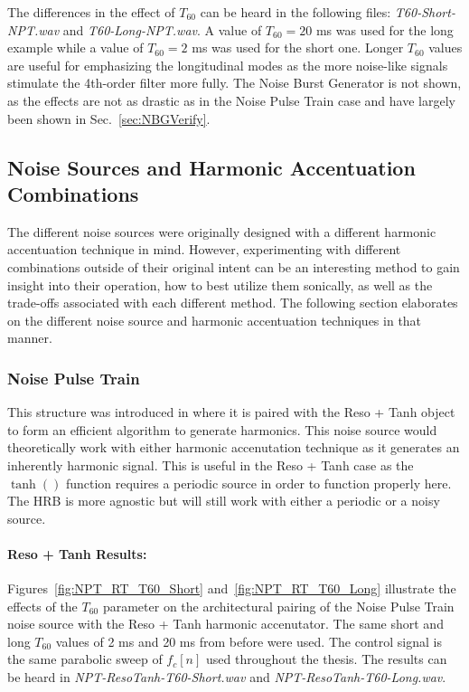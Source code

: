 \documentclass[../main.tex]{subfiles}
\begin{document}
The differences in the effect of $T_{60}$ can be heard in the following files: \emph{T60-Short-NPT.wav} and \emph{T60-Long-NPT.wav}. A value of $T_{60} = 20$ ms was used for the long example while a value of $T_{60} = 2$ ms was used for the short one. Longer $T_{60}$ values are useful for emphasizing the longitudinal modes as the more noise-like signals stimulate the 4th-order filter more fully. The Noise Burst Generator is not shown, as the effects are not as drastic as in the Noise Pulse Train case and have largely been shown in Sec.~\ref{sec:NBGVerify}.

\subsection{Noise Sources and Harmonic Accentuation Combinations}
The different noise sources were originally designed with a different harmonic accentuation technique in mind. However, experimenting with different combinations outside of their original intent can be an interesting method to gain insight into their operation, how to best utilize them sonically, as well as the trade-offs associated with each different method. The following section elaborates on the different noise source and harmonic accentuation techniques in that manner.

\subsubsection{Noise Pulse Train}
This structure was introduced in  where it is paired with the Reso + Tanh object to form an efficient algorithm to generate harmonics. This noise source would theoretically work with either harmonic accenutation technique as it generates an inherently harmonic signal. This is useful in the Reso + Tanh case as the $\tanh()$ function requires a periodic source in order to function properly here. The HRB is more agnostic but will still work with either a periodic or a noisy source.

\paragraph{Reso + Tanh Results:}
Figures~\ref{fig:NPT_RT_T60_Short} and~\ref{fig:NPT_RT_T60_Long} illustrate the effects of the $T_{60}$ parameter on the architectural pairing of the Noise Pulse Train noise source with the Reso + Tanh harmonic accenutator. The same short and long $T_{60}$ values of 2 ms and 20 ms from before were used. The control signal is the same parabolic sweep of $f_c[n]$ used throughout the thesis. The results can be heard in \emph{NPT-ResoTanh-T60-Short.wav} and \emph{NPT-ResoTanh-T60-Long.wav}.
\end{document}
